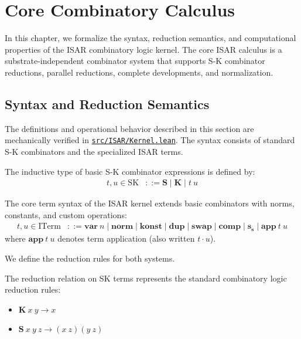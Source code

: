 \chapter{Core Combinatory Calculus}

In this chapter, we formalize the syntax, reduction semantics, and computational properties of the ISAR combinatory logic kernel. The core ISAR calculus is a substrate-independent combinator system that supports S-K combinator reductions, parallel reductions, complete developments, and normalization.

\section{Syntax and Reduction Semantics}

The definitions and operational behavior described in this section are mechanically verified in \href{https://github.com/cypoe/isar-proofs/blob/master/src/ISAR/Kernel.lean}{\texttt{src/ISAR/Kernel.lean}}. The syntax consists of standard S-K combinators and the specialized ISAR terms.

\begin{definition}
The inductive type of basic S-K combinator expressions is defined by:
\begin{align*}
t, u \in \text{SK} &::= \mathbf{S} \mid \mathbf{K} \mid t\ u
\end{align*}
\end{definition}

\begin{definition}
The core term syntax of the ISAR kernel extends basic combinators with norms, constants, and custom operations:
\begin{align*}
t, u \in \text{ITerm} &::= \mathbf{var}\ n \mid \mathbf{norm} \mid \mathbf{konst} \mid \mathbf{dup} \mid \mathbf{swap} \mid \mathbf{comp} \mid \mathbf{s_s} \mid \mathbf{app}\ t\ u
\end{align*}
where $\mathbf{app}\ t\ u$ denotes term application (also written $t \cdot u$).
\end{definition}

We define the reduction rules for both systems.

\begin{definition}
The reduction relation on SK terms represents the standard combinatory logic reduction rules:
\begin{itemize}
    \item $\mathbf{K}\ x\ y \to x$
    \item $\mathbf{S}\ x\ y\ z \to (x\ z)(y\ z)$
\end{itemize}
\end{definition}

